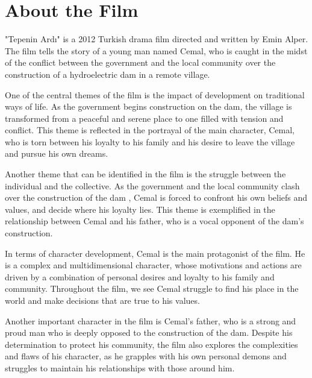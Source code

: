 \documentclass[12pt]{article}
\begin{document}

\section{About the Film}

"Tepenin Ardı" is a 2012 Turkish drama film directed and written by Emin Alper. The film tells the story of a young man named Cemal, who is caught in the midst of the conflict between the government and the local community over the construction of a hydroelectric dam in a remote village.

One of the central themes of the film is the impact of development on traditional ways of life. As the government begins construction on the dam, the village is transformed from a peaceful and serene place to one filled with tension and conflict. This theme is reflected in the portrayal of the main character, Cemal, who is torn between his loyalty to his family and his desire to leave the village and pursue his own dreams.

Another theme that can be identified in the film is the struggle between the individual and the collective. As the government and the local community clash over the construction of the dam
, Cemal is forced to confront his own beliefs and values, and decide where his loyalty lies. This theme is exemplified in the relationship between Cemal and his father, who is a vocal opponent of the dam's construction.

In terms of character development, Cemal is the main protagonist of the film. He is a complex and multidimensional character, whose motivations and actions are driven by a combination of personal desires and loyalty to his family and community. Throughout the film, we see Cemal struggle to find his place in the world and make decisions that are true to his values.

Another important character in the film is Cemal's father, who is a strong and proud man who is deeply opposed to the construction of the dam. Despite his determination to protect his community, the film also explores the complexities and flaws of his character, as he grapples with his own personal demons and struggles to maintain his relationships with those around him.
\end{document}
